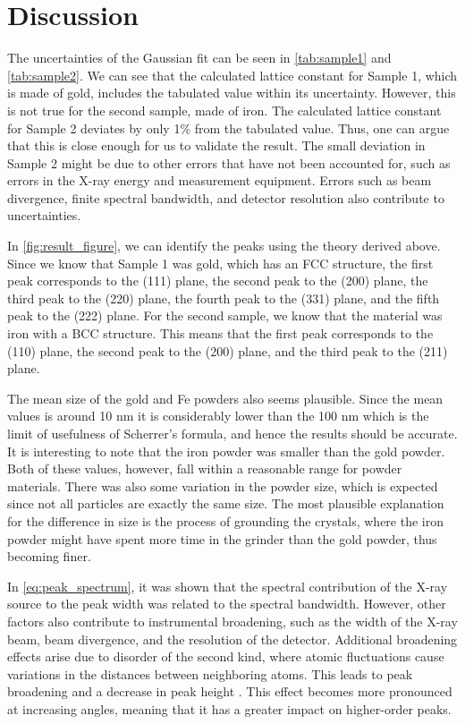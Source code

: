 \newpage
\section{Discussion}
The uncertainties of the Gaussian fit can be seen in \autoref{tab:sample1} and \autoref{tab:sample2}. We can see that the calculated lattice constant for Sample 1, which is made of gold, includes the tabulated value within its uncertainty. However, this is not true for the second sample, made of iron. The calculated lattice constant for Sample 2 deviates by only 1\% from the tabulated value. Thus, one can argue that this is close enough for us to validate the result. The small deviation in Sample 2 might be due to other errors that have not been accounted for, such as errors in the X-ray energy and measurement equipment. Errors such as beam divergence, finite spectral bandwidth, and detector resolution also contribute to uncertainties.


In \autoref{fig:result_figure}, we can identify the peaks using the theory derived above. Since we know that Sample 1 was gold, which has an FCC structure, the first peak corresponds to the (111) plane, the second peak to the (200) plane, the third peak to the (220) plane, the fourth peak to the (331) plane, and the fifth peak to the (222) plane. For the second sample, we know that the material was iron with a BCC structure. This means that the first peak corresponds to the (110) plane, the second peak to the (200) plane, and the third peak to the (211) plane.

The mean size of the gold and Fe powders also seems plausible. Since the mean values is around 10 nm it is considerably lower than the 100 nm which is the limit of usefulness of Scherrer's formula, and hence the results should be accurate. It is interesting to note that the iron powder was smaller than the gold powder. Both of these values, however, fall within a reasonable range for powder materials. There was also some variation in the powder size, which is expected since not all particles are exactly the same size. The most plausible explanation for the difference in size is the process of grounding the crystals, where the iron powder might have spent more time in the grinder than the gold powder, thus becoming finer.

In \autoref{eq:peak_spectrum}, it was shown that the spectral contribution of the X-ray source to the peak width was related to the spectral bandwidth. However, other factors also contribute to instrumental broadening, such as the width of the X-ray beam, beam divergence, and the resolution of the detector. Additional broadening effects arise due to disorder of the second kind, where atomic fluctuations cause variations in the distances between neighboring atoms. This leads to peak broadening and a decrease in peak height \cite{guinier1963xray}. This effect becomes more pronounced at increasing angles, meaning that it has a greater impact on higher-order peaks.
